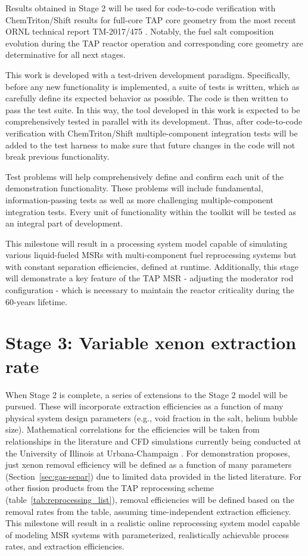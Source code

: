 Results obtained in Stage 2 will be used for code-to-code verification with  
ChemTriton/Shift results for full-core \gls{TAP} core geometry from the most 
recent \gls{ORNL} technical report TM-2017/475 \cite{betzler_assessment_2017}. 
Notably, the fuel salt composition evolution during the \gls{TAP} reactor 
operation and corresponding core geometry are determinative for all next 
stages.

This work is developed with a test-driven development paradigm. Specifically, 
before any new functionality is implemented, a suite of tests is written, 
which as carefully define its expected behavior as possible. The code is then 
written to pass the test suite. In this way, the tool developed in this work 
is expected to be comprehensively tested in parallel with its development. 
Thus, after code-to-code verification with ChemTriton/Shift multiple-component 
integration tests will be added to the test harness to make sure that future 
changes in the code will not break previous functionality.

Test problems will help comprehensively define and confirm each unit of the 
demonstration functionality. These problems will include fundamental, 
information-passing tests as well as more challenging multiple-component 
integration tests. Every unit of functionality within the toolkit will be 
tested as an integral part of development.

This milestone will result in a processing system model capable of simulating
various liquid-fueled \glspl{MSR} with multi-component fuel reprocessing 
systems but with constant separation efficiencies, defined at runtime. 
Additionally, this stage will demonstrate a key feature of the \gls{TAP} 
\gls{MSR} - adjusting the moderator rod configuration - which is necessary to 
maintain the reactor criticality during the 60-years lifetime. 

\section{Stage 3: Variable xenon extraction rate} \label{sec:xe-removal-rate}
When Stage 2 is complete, a series of extensions to the Stage 2 model will 
be pursued. These will incorporate extraction efficiencies as a function of 
many physical system design parameters (e.g., void fraction in the salt, 
helium bubble size). Mathematical correlations for the efficiencies will be 
taken from relationships in the literature \cite{peebles_removal_1968, 
gabbard_development_1974} and CFD simulations currently being conducted 
at the University of Illinois at Urbana-Champaign \cite{huff_enabling_2018}. 
For demonstration proposes, just xenon removal efficiency will be defined as a 
function of many parameters (Section~\ref{sec:gas-separ}) due to 
limited data provided in the listed literature. For other fission products  
from the \gls{TAP} reprocessing scheme (table~\ref{tab:reprocessing_list}), 
removal efficiencies will be defined based on the removal rates from the 
table, assuming time-independent extraction efficiency. This milestone will 
result in a realistic online reprocessing system model capable of modeling 
\gls{MSR} systems with parameterized, realistically achievable process rates,  
and extraction efficiencies.


